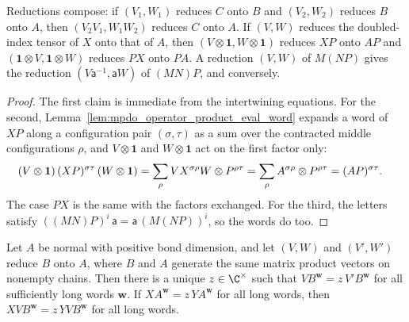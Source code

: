 \begin{lemma}
    \label{thm:mpug_reduction_composition}
    \leanok
    Reductions compose: if $(V_1,W_1)$ reduces $C$ onto $B$ and
    $(V_2,W_2)$ reduces $B$ onto $A$, then $(V_2V_1,W_1W_2)$ reduces $C$
    onto $A$. If $(V,W)$ reduces the doubled-index tensor of $X$ onto that
    of $A$, then $(V\otimes\mathbf 1,W\otimes\mathbf 1)$ reduces $XP$ onto
    $AP$ and $(\mathbf 1\otimes V,\mathbf 1\otimes W)$ reduces $PX$ onto
    $PA$. A reduction $(V,W)$ of $M(NP)$ gives the reduction
    $(V\mathsf a^{-1},\mathsf aW)$ of $(MN)P$, and conversely.
\end{lemma}

\begin{proof}\leanok
    The first claim is immediate from the intertwining equations. For the
    second, Lemma~\ref{lem:mpdo_operator_product_eval_word} expands a word of
    $XP$ along a configuration pair $(\sigma,\tau)$ as a sum over the
    contracted middle configurations $\rho$, and $V\otimes\mathbf 1$ and
    $W\otimes\mathbf 1$ act on the first factor only:
    \begin{align}
        (V\otimes\mathbf 1)\,(XP)^{\sigma\tau}\,(W\otimes\mathbf 1)
         & =\sum_\rho VX^{\sigma\rho}W\otimes P^{\rho\tau}
        =\sum_\rho A^{\sigma\rho}\otimes P^{\rho\tau}
        =(AP)^{\sigma\tau}.
        \notag
    \end{align}
    The case $PX$ is the same with the factors exchanged. For the third, the
    letters satisfy
    $((MN)P)^{i}\,\mathsf a=\mathsf a\,(M(NP))^{i}$, so the words do too.
\end{proof}

\begin{lemma}
    \label{thm:mpug_dressed_proportionality}
    \leanok
    Let $A$ be normal with positive bond dimension, and let $(V,W)$ and
    $(V',W')$ reduce $B$ onto $A$, where $B$ and $A$ generate the same
    matrix product vectors on nonempty chains. Then there is a unique
    $z\in\C^\times$ such that $VB^{\mathbf w}=z\,V'B^{\mathbf w}$ for all
    sufficiently long words $\mathbf w$. If
    $XA^{\mathbf w}=z\,YA^{\mathbf w}$ for all long words, then
    $XVB^{\mathbf w}=z\,YVB^{\mathbf w}$ for all long words.
\end{lemma}


